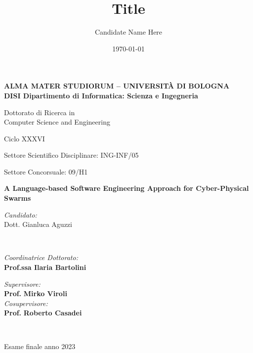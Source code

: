 \title{Title}
\author{Candidate Name Here}
\date{\today}

\begin{titlepage}
	\begin{center}
		
		\large
		\textbf{ALMA MATER STUDIORUM -- UNIVERSITÀ DI BOLOGNA \\ DISI Dipartimento di Informatica: Scienza e Ingegneria}
		\\
		\noindent\hrulefill
		\vspace{0.4cm}
		
		\Large
		Dottorato di Ricerca in \\
		Computer Science and Engineering

		\vspace{0.4cm}

		Ciclo XXXVI

		\vspace{0.4cm}

		Settore Scientifico Disciplinare: ING-INF/05
		
		Settore Concorsuale: 09/H1
		
		\Huge
		\vspace{3cm}
		\textbf{
			A Language-based Software Engineering Approach for Cyber-Physical Swarms
		}
		
		{\Large{
		\vspace{3cm}
		
		\textit{Candidato:\\}
		\centering
		Dott. Gianluca Aguzzi}
		\\}
		\large
		\vspace{2.5cm}
		\begin{minipage}[t]{0.64\textwidth}
			\begin{flushleft}
				\textit{Coordinatrice Dottorato:} 
				\\ 
				\textbf{Prof.ssa Ilaria Bartolini}
			\end{flushleft}
		\end{minipage}
		\begin{minipage}[t]{0.34\textwidth}
			\begin{flushright}
				\textit{Supervisore:} 
				\\ 
				\textbf{Prof.} \textbf{Mirko Viroli}
				\\
				\vspace{0.4cm}
				\textit{Cosupervisore:} 
				\\
				\textbf{Prof.} \textbf{Roberto Casadei}
			\end{flushright}
		
		\end{minipage}\\
		
		\vfill
		\noindent\hrulefill
		\vspace{0.3cm}
		\Large

		Esame finale anno 2023
	\end{center}
\end{titlepage}
\restoregeometry

